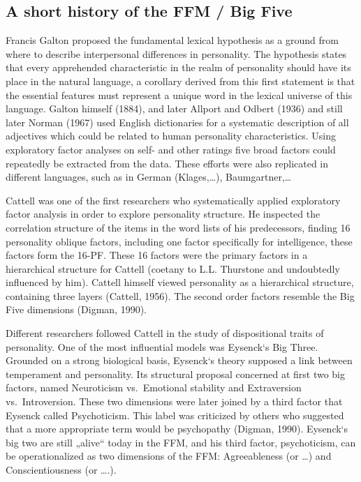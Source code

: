 \documentclass[man]{apa6}
\theoremstyle{definition}
\theoremstyle{definition}
\theoremstyle{definition}
\theoremstyle{remark}
\begin{document}
\hypertarget{a-short-history-of-the-ffm-big-five}{%
\subsection{A short history of the FFM / Big
Five}\label{a-short-history-of-the-ffm-big-five}}

Francis Galton proposed the fundamental lexical hypothesis as a ground
from where to describe interpersonal differences in personality. The
hypothesis states that every apprehended characteristic in the realm of
personality should have its place in the natural language, a corollary
derived from this first statement is that the essential features must
represent a unique word in the lexical universe of this language. Galton
himself (1884), and later Allport and Odbert (1936) and still later
Norman (1967) used English dictionaries for a systematic description of
all adjectives which could be related to human personality
characteristics. Using exploratory factor analyses on self- and other
ratings five broad factors could repeatedly be extracted from the data.
These efforts were also replicated in different languages, such as in
German (Klages,\ldots{}), Baumgartner,\ldots{}

Cattell was one of the first researchers who systematically applied
exploratory factor analysis in order to explore personality structure.
He inspected the correlation structure of the items in the word lists of
his predecessors, finding 16 personality oblique factors, including one
factor specifically for intelligence, these factors form the 16-PF.
These 16 factors were the primary factors in a hierarchical structure
for Cattell (coetany to L.L. Thurstone and undoubtedly influenced by
him). Cattell himself viewed personality as a hierarchical structure,
containing three layers (Cattell, 1956). The second order factors
resemble the Big Five dimensions (Digman, 1990).

Different researchers followed Cattell in the study of dispositional
traits of personality. One of the most influential models was Eysenck`s
Big Three. Grounded on a strong biological basis, Eysenck`s theory
supposed a link between temperament and personality. Its structural
proposal concerned at first two big factors, named Neuroticism
vs.~Emotional stability and Extraversion vs.~Introversion. These two
dimensions were later joined by a third factor that Eysenck called
Psychoticism. This label was criticized by others who suggested that a
more appropriate term would be psychopathy (Digman, 1990). Eysenck`s big
two are still „alive`` today in the FFM, and his third factor,
psychoticism, can be operationalized as two dimensions of the FFM:
Agreeableness (or \ldots{}) and Conscientiousness (or \ldots{}.).
\end{document}
